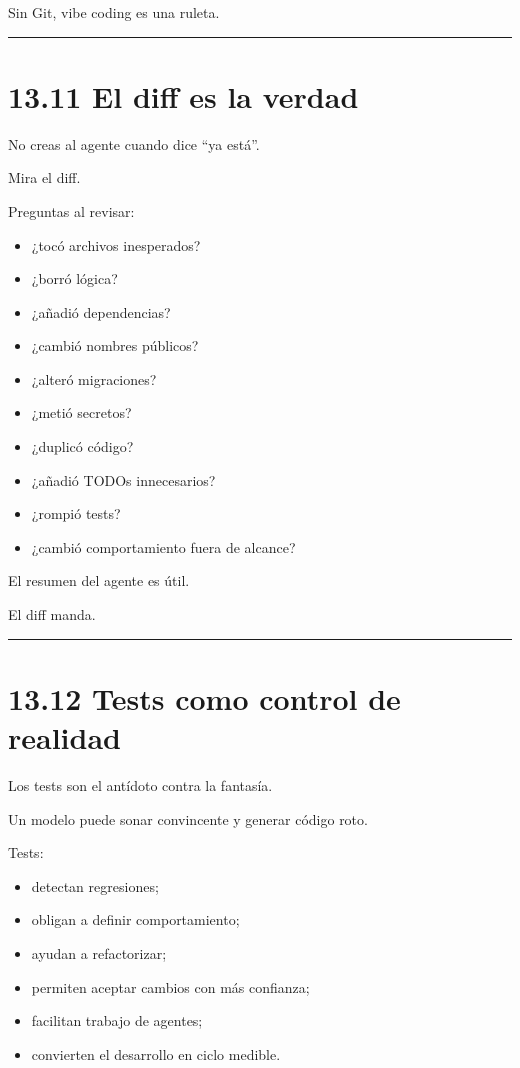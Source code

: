 Sin Git, vibe coding es una ruleta.

\begin{center}\rule{0.5\linewidth}{0.5pt}\end{center}

\section{13.11 El diff es la verdad}\label{el-diff-es-la-verdad}

No creas al agente cuando dice ``ya está''.

Mira el diff.

Preguntas al revisar:

\begin{itemize}
\tightlist
\item
  ¿tocó archivos inesperados?
\item
  ¿borró lógica?
\item
  ¿añadió dependencias?
\item
  ¿cambió nombres públicos?
\item
  ¿alteró migraciones?
\item
  ¿metió secretos?
\item
  ¿duplicó código?
\item
  ¿añadió TODOs innecesarios?
\item
  ¿rompió tests?
\item
  ¿cambió comportamiento fuera de alcance?
\end{itemize}

El resumen del agente es útil.

El diff manda.

\begin{center}\rule{0.5\linewidth}{0.5pt}\end{center}

\section{13.12 Tests como control de
realidad}\label{tests-como-control-de-realidad}

Los tests son el antídoto contra la fantasía.

Un modelo puede sonar convincente y generar código roto.

Tests:

\begin{itemize}
\tightlist
\item
  detectan regresiones;
\item
  obligan a definir comportamiento;
\item
  ayudan a refactorizar;
\item
  permiten aceptar cambios con más confianza;
\item
  facilitan trabajo de agentes;
\item
  convierten el desarrollo en ciclo medible.
\end{itemize}

